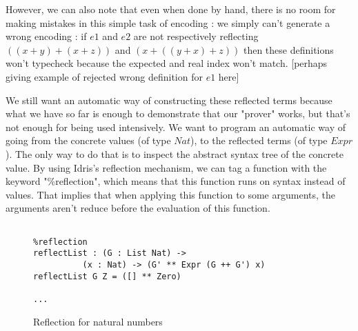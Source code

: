 However, we can also note that even when done by hand, there is no room for making mistakes in this simple task of encoding : we simply can't generate a wrong encoding : if $e1$ and $e2$ are not respectively reflecting $((x+y) + (x+z))$ and $(x + ((y + x) + z))$ then these definitions won't typecheck because the expected and real index won't match. [perhaps giving example of rejected wrong definition for $e1$ here]

We still want an automatic way of constructing these reflected terms because what we have so far is enough to demonstrate that our "prover" works, but that's not enough for being used intensively. We want to program an automatic way of going from the concrete values (of type $Nat$), to the reflected terms (of type $Expr$). The only way to do that is to inspect the abstract syntax tree of the concrete value.
By using Idris's reflection mechanism, we can tag a function with the keyword "\%reflection", which means that this function runs on syntax instead of values. That implies that when applying this function to some arguments, the arguments aren't reduce before the evaluation of this function.


\begin{figure}[H]
\figrule
\begin{center}
\begin{verbatim}

%reflection
reflectList : (G : List Nat) ->
          (x : Nat) -> (G' ** Expr (G ++ G') x)
reflectList G Z = ([] ** Zero)

...

\end{verbatim}
\end{center}
\caption{Reflection for natural numbers}
\figrule
\end{figure}





